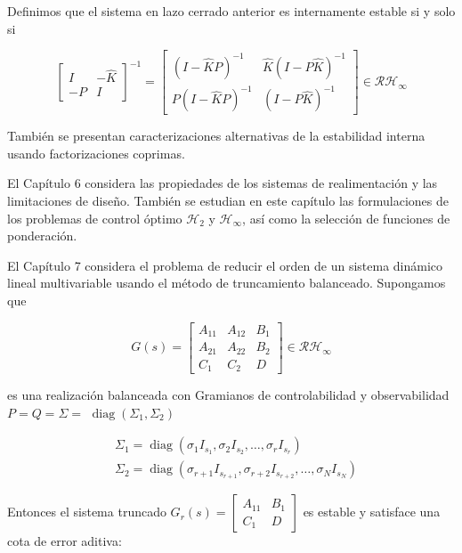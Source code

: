 Definimos que el sistema en lazo cerrado anterior es internamente estable si y solo si

$$
\left[\begin{array}{cc}
I & -\hat{K} \\
-P & I
\end{array}\right]^{-1}=\left[\begin{array}{cc}
(I-\hat{K} P)^{-1} & \hat{K}(I-P \hat{K})^{-1} \\
P(I-\hat{K} P)^{-1} & (I-P \hat{K})^{-1}
\end{array}\right] \in \mathcal{R} \mathcal{H}_{\infty}
$$

También se presentan caracterizaciones alternativas de la estabilidad interna usando factorizaciones coprimas.

El Capítulo 6 considera las propiedades de los sistemas de realimentación y las limitaciones de diseño. También se estudian en este capítulo las formulaciones de los problemas de control óptimo $\mathcal{H}_{2}$ y $\mathcal{H}_{\infty}$, así como la selección de funciones de ponderación.

El Capítulo 7 considera el problema de reducir el orden de un sistema dinámico lineal multivariable usando el método de truncamiento balanceado. Supongamos que

$$
G(s)=\left[\begin{array}{cc|c}
A_{11} & A_{12} & B_{1} \\
A_{21} & A_{22} & B_{2} \\
\hline C_{1} & C_{2} & D
\end{array}\right] \in \mathcal{R} \mathcal{H}_{\infty}
$$

es una realización balanceada con Gramianos de controlabilidad y observabilidad $P=Q=\Sigma=$ $\operatorname{diag}\left(\Sigma_{1}, \Sigma_{2}\right)$

$$
\begin{aligned}
& \Sigma_{1}=\operatorname{diag}\left(\sigma_{1} I_{s_{1}}, \sigma_{2} I_{s_{2}}, \ldots, \sigma_{r} I_{s_{r}}\right) \\
& \Sigma_{2}=\operatorname{diag}\left(\sigma_{r+1} I_{s_{r+1}}, \sigma_{r+2} I_{s_{r+2}}, \ldots, \sigma_{N} I_{s_{N}}\right)
\end{aligned}
$$

Entonces el sistema truncado $G_{r}(s)=\left[\begin{array}{c|c}A_{11} & B_{1} \\ \hline C_{1} & D\end{array}\right]$ es estable y satisface una cota de error aditiva:

